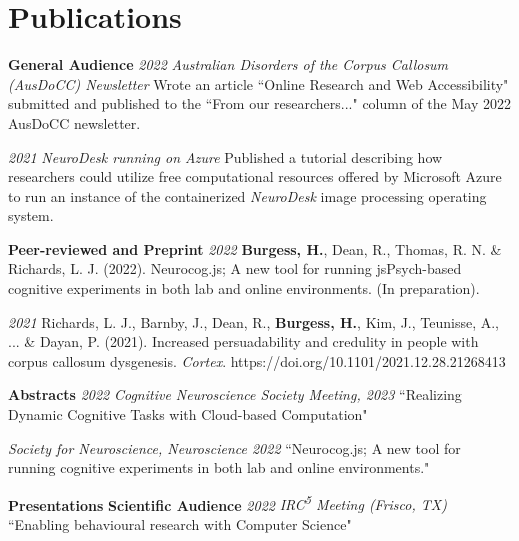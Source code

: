 \documentclass{article}
\begin{document}
  \section*{Publications}
  \large\textbf{General Audience} 
  \large\textit{2022} 
  \large\textit{Australian Disorders of the Corpus Callosum (AusDoCC) Newsletter} 
  Wrote an article ``Online Research and Web Accessibility" submitted and published to the ``From our researchers..." column of the May 2022 AusDoCC newsletter.   
  
                      
  \large\textit{2021} 
  \large\textit{NeuroDesk running on Azure}    
  Published a tutorial describing how researchers could utilize free computational resources offered by Microsoft Azure to run an instance of the containerized \textit{NeuroDesk} image processing operating system. 
  
                      
  \large\textbf{Peer-reviewed and Preprint} 
  \large\textit{2022}
  \textbf{Burgess, H.}, Dean, R., Thomas, R. N. \& Richards, L. J. (2022). Neurocog.js; A new tool for running jsPsych-based cognitive experiments in both lab and online environments. (In preparation). 


  \large\textit{2021} 
  Richards, L. J., Barnby, J., Dean, R., \textbf{Burgess, H.}, Kim, J., Teunisse, A., ... \& Dayan, P. (2021). Increased persuadability and credulity in people with corpus callosum dysgenesis. \textit{Cortex}. 
  https://doi.org/10.1101/2021.12.28.21268413 

  \large\textbf{Abstracts}
  \large\textit{2022}
  \large\textit{Cognitive Neuroscience Society Meeting, 2023} 
  ``Realizing Dynamic Cognitive Tasks with Cloud-based Computation"  
  

  \large\textit{Society for Neuroscience, Neuroscience 2022}
  ``Neurocog.js; A new tool for running cognitive experiments in both lab and online environments."

  \large\textbf{Presentations}
  \large\textbf{Scientific Audience}
  \large\textit{2022}
  \large\textit{IRC\textsuperscript{5} Meeting (Frisco, TX)}
  ``Enabling behavioural research with Computer Science"
\end{document}
